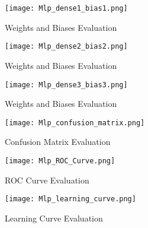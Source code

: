 \documentclass[
	article, %
	11pt, %
	draft, %
]{CSUniSchoolLabReport}
\begin{document}
\begin{figure}[H] 
  \centering
  \texttt{[image: Mlp\_dense1\_bias1.png]}
  \caption{Weights and Biases Evaluation}\label{fig:Weights_and_biases_visual}
\end{figure}

\begin{figure}[H] 
  \centering
  \texttt{[image: Mlp\_dense2\_bias2.png]}
  \caption{Weights and Biases Evaluation}\label{fig:Weights_and_biases_visual}
\end{figure}

\begin{figure}[H] 
  \centering
  \texttt{[image: Mlp\_dense3\_bias3.png]}
  \caption{Weights and Biases Evaluation}\label{fig:Weights_and_biases_visual}
\end{figure}

\begin{figure}[H] 
  \centering
  \texttt{[image: Mlp\_confusion\_matrix.png]}
  \caption{Confusion Matrix Evaluation}\label{fig:mlp_confusion_matrix}
\end{figure}

\begin{figure}[H] 
  \centering
  \texttt{[image: Mlp\_ROC\_Curve.png]}
  \caption{ROC Curve Evaluation}\label{fig:mlp_roc_curve}
\end{figure}

\begin{figure}[H]
  \centering
  \texttt{[image: Mlp\_learning\_curve.png]}
  \caption{Learning Curve Evaluation}\label{fig:mlp_learning_curve}
\end{figure}


\end{document}
